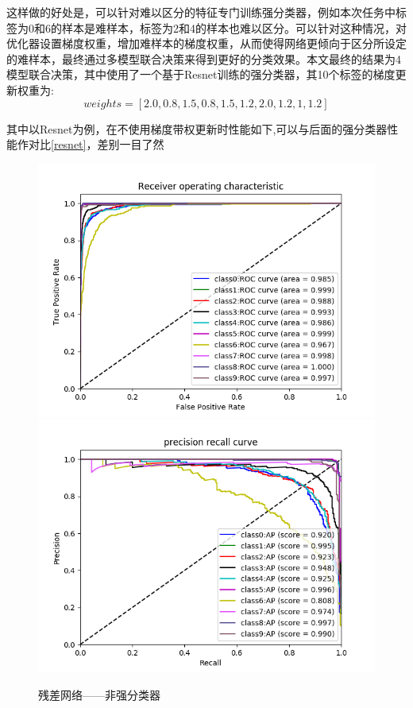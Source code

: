 \documentclass[UTF8]{ctexart}
\begin{document}
这样做的好处是，可以针对难以区分的特征专门训练强分类器，例如本次任务中标签为0和6的样本是难样本，标签为2和4的样本也难以区分。可以针对这种情况，对优化器设置梯度权重，增加难样本的梯度权重，从而使得网络更倾向于区分所设定的难样本，最终通过多模型联合决策来得到更好的分类效果。本文最终的结果为4模型联合决策，其中使用了一个基于Resnet训练的强分类器，其10个标签的梯度更新权重为:
\begin{equation}
    weights = [2.0,0.8,1.5,0.8,1.5,1.2,2.0,1.2,1,1.2]
\end{equation}

其中以Resnet为例，在不使用梯度带权更新时性能如下,可以与后面的强分类器性能作对比\ref{resnet}，差别一目了然
\begin{figure}[H]
    \centering
    \includegraphics[scale=0.35]{../images/res18roc.png}
    \includegraphics[scale=0.35]{../images/res18pro.png}
    \caption{残差网络——非强分类器}
\end{figure}
\end{document}
